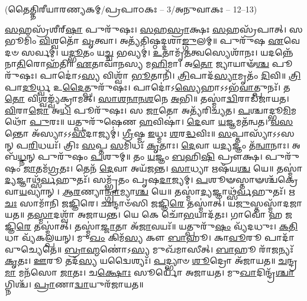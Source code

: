 
\centerline{\scriptsize(𑌤𑍈𑌤𑍍𑌤𑌿𑌰𑍀𑌯𑌾𑌰𑌣𑍍𑌯𑌕𑌮𑍍/𑌪𑍍𑌰𑌪𑌾𑌠𑌕𑌃 – 3/𑌅𑌨𑍁𑌵𑌾𑌕𑌃 – 12--13)}

\-\ul{𑌸}\-𑌹𑌸𑍍𑌰᳴𑌶𑍀𑌰𑍍‌\-\ul{𑌷𑌾} 𑌪𑍁𑌰𑍁᳴𑌷𑌃। 
\-\ul{𑌸}\-\-\ul{𑌹}\-\-\ul{𑌸𑍍𑌰𑌾}\-𑌕𑍍𑌷𑌃 \ul{𑌸}\-𑌹𑌸𑍍𑌰᳴𑌪𑌾𑌤𑍍। 
𑌸 𑌭𑍂𑌮𑌿𑌂᳴ \ul{𑌵𑌿}\-𑌶𑍍𑌵𑌤𑍋᳴ \ul{𑌵𑍃}\-𑌤𑍍𑌵𑌾। 
𑌅𑌤𑍍𑌯᳴𑌤𑌿𑌷𑍍𑌠𑌦𑍍𑌦𑌶𑌾\-\ul{𑌙𑍍𑌗𑍁}\-𑌲𑌮𑍍॥ 
% 
𑌪𑍁𑌰𑍁᳴𑌷 \ul{𑌏}\-𑌵𑍇𑌦𑍞 𑌸𑌰𑍍𑌵𑌮𑍍॑। 
𑌯\-\ul{𑌦𑍍𑌭𑍂}\-𑌤𑌂 𑌯\-\ul{𑌚𑍍𑌚} 𑌭𑌵𑍍𑌯𑌮𑍍॑। 
\-\ul{𑌉}\-𑌤𑌾𑌮𑍃᳴\-\ul{𑌤}\-𑌤𑍍𑌵𑌸𑍍𑌯𑍇𑌶𑌾᳴𑌨𑌃। 
𑌯𑌦𑌨𑍍𑌨𑍇᳴𑌨𑌾\-\ul{𑌤𑌿}\-𑌰𑍋𑌹᳴𑌤𑌿॥ 
% 
\-\ul{𑌏}\-𑌤𑌾𑌵𑌾᳴𑌨𑌸𑍍𑌯 𑌮\-\ul{𑌹𑌿}\-𑌮𑌾। 
𑌅\-\ul{𑌤𑍋} 𑌜𑍍𑌯𑌾𑌯𑌾𑍟᳴\-\ul{𑌶𑍍𑌚} 𑌪𑍂𑌰𑍁᳴𑌷𑌃। 
𑌪𑌾𑌦𑍋॑𑌽\-\ul{𑌸𑍍𑌯} 𑌵𑌿𑌶𑍍𑌵𑌾᳴ \ul{𑌭𑍂}\-𑌤𑌾𑌨𑌿᳴। 
\-\ul{𑌤𑍍𑌰𑌿}\-𑌪𑌾𑌦᳴\-\ul{𑌸𑍍𑌯𑌾}\-𑌮𑍃𑌤𑌂᳴ \ul{𑌦𑌿}\-𑌵𑌿॥ 
% 
\-\ul{𑌤𑍍𑌰𑌿}\-𑌪𑌾\-\ul{𑌦𑍂}\-𑌰𑍍𑌧𑍍𑌵 𑌉\-\ul{𑌦𑍈}\-𑌤𑍍𑌪𑍁𑌰𑍁᳴𑌷𑌃। 
𑌪𑌾𑌦𑍋॑𑌽\-\ul{𑌸𑍍𑌯𑍇}\-𑌹𑌾𑌽𑌽𑌭᳴\-\ul{𑌵𑌾}\-𑌤𑍍𑌪𑍁𑌨𑌃᳴। 
𑌤\-\ul{𑌤𑍋} 𑌵𑌿\-\ul{𑌶𑍍𑌵}\-𑌙𑍍𑌵𑍍𑌯᳴𑌕𑍍𑌰𑌾𑌮𑌤𑍍। 
\-\ul{𑌸𑌾}\-\-\ul{𑌶}\-\-\ul{𑌨𑌾}\-\-\ul{𑌨}\-\-\ul{𑌶}\-𑌨𑍇 \ul{𑌅}\-𑌭𑌿॥ 
% 
𑌤𑌸𑍍𑌮𑌾॑\-\ul{𑌦𑍍𑌵𑌿}\-𑌰𑌾𑌡᳴𑌜𑌾𑌯𑌤। 
\-\ul{𑌵𑌿}\-𑌰𑌾\-\ul{𑌜𑍋} 𑌅\-\ul{𑌧𑌿} 𑌪𑍂𑌰𑍁᳴𑌷𑌃। 
𑌸 \ul{𑌜𑌾}\-𑌤𑍋 𑌅𑌤𑍍𑌯᳴𑌰𑌿𑌚𑍍𑌯𑌤। 
\-\ul{𑌪}\-𑌶𑍍𑌚𑌾𑌦𑍍𑌭𑍂\-\ul{𑌮𑌿}\-𑌮𑌥𑍋᳴ \ul{𑌪𑍁}\-𑌰𑌃॥ 
% 
 𑌯𑌤𑍍𑌪𑍁𑌰𑍁᳴𑌷𑍇𑌣 \ul{𑌹}\-𑌵𑌿𑌷𑌾॑। 
\-\ul{𑌦𑍇}\-𑌵𑌾 \ul{𑌯}\-𑌜𑍍𑌞𑌮𑌤᳴𑌨𑍍𑌵𑌤। 
\-\ul{𑌵}\-\-\ul{𑌸}\-𑌨𑍍𑌤𑍋 𑌅᳴𑌸𑍍𑌯𑌾𑌽𑌽\-\ul{𑌸𑍀}\-𑌦𑌾𑌜𑍍𑌯𑌮𑍍॑। 
\-\ul{𑌗𑍍𑌰𑍀}\-𑌷𑍍𑌮 \ul{𑌇}\-𑌧𑍍𑌮𑌃 \ul{𑌶}\-𑌰\-\ul{𑌦𑍍𑌧}\-𑌵𑌿𑌃॥ 
% 
 \ul{𑌸}\-𑌪𑍍𑌤𑌾𑌸𑍍𑌯𑌾᳴𑌽𑌽𑌸𑌨𑍍  𑌪\-\ul{𑌰𑌿}\-𑌧𑌯𑌃᳴। 
𑌤𑍍𑌰𑌿𑌃 \ul{𑌸}\-𑌪𑍍𑌤 \ul{𑌸}\-𑌮𑌿𑌧𑌃᳴ \ul{𑌕𑍃}\-𑌤𑌾𑌃। 
\-\ul{𑌦𑍇}\-𑌵𑌾 𑌯\-\ul{𑌦𑍍𑌯}\-𑌜𑍍𑌞𑌂 𑌤᳴\-\ul{𑌨𑍍𑌵𑌾}\-𑌨𑌾𑌃। 
𑌅𑌬᳴\-\ul{𑌧𑍍𑌨}\-𑌨𑍍 𑌪𑍁𑌰𑍁᳴𑌷𑌂 \ul{𑌪}\-𑌶𑍁𑌮𑍍॥ 
% 
 𑌤𑌂 \ul{𑌯}\-𑌜𑍍𑌞𑌂 \ul{𑌬}\-\ar 𑌹𑌿\-\ul{𑌷𑌿} 𑌪𑍍𑌰𑍗𑌕𑍍𑌷\sn। 
𑌪𑍁𑌰𑍁᳴𑌷𑌂 \ul{𑌜𑌾}\-𑌤𑌮᳴\-\ul{𑌗𑍍𑌰}\-𑌤𑌃। 
𑌤𑍇𑌨᳴ \ul{𑌦𑍇}\-𑌵𑌾 𑌅𑌯᳴𑌜𑌨𑍍𑌤। 
\-\ul{𑌸𑌾}\-𑌧𑍍𑌯𑌾 𑌋𑌷᳴𑌯\-\ul{𑌶𑍍𑌚} 𑌯𑍇॥ 
% 
𑌤𑌸𑍍𑌮𑌾॑\-\ul{𑌦𑍍𑌯}\-𑌜𑍍𑌞𑌾𑌥𑍍𑌸᳴\-\ul{𑌰𑍍𑌵}\-𑌹𑍁𑌤𑌃᳴। 
𑌸𑌮𑍍𑌭𑍃᳴𑌤𑌂 𑌪𑍃𑌷\-\ul{𑌦𑌾}\-𑌜𑍍𑌯𑌮𑍍। 
\-\ul{𑌪}\-𑌶𑍂𑍟𑌸𑍍𑌤𑌾𑍟𑌶𑍍𑌚᳴𑌕𑍍𑌰𑍇 𑌵𑌾\-\ul{𑌯}\-𑌵𑍍𑌯𑌾𑌨𑍍। 
\-\ul{𑌆}\-\-\ul{𑌰}\-𑌣𑍍𑌯𑌾\-\ul{𑌨𑍍𑌗𑍍𑌰𑌾}\-𑌮𑍍𑌯𑌾\-\ul{𑌶𑍍𑌚} 𑌯𑍇॥ 
% 
 𑌤𑌸𑍍𑌮𑌾॑\-\ul{𑌦𑍍𑌯}\-𑌜𑍍𑌞𑌾𑌥𑍍𑌸᳴\-\ul{𑌰𑍍𑌵}\-𑌹𑍁𑌤𑌃᳴। 
𑌋\-\ul{𑌚𑌃} 𑌸𑌾𑌮𑌾᳴𑌨𑌿 𑌜𑌜𑍍𑌞𑌿𑌰𑍇। 
𑌛𑌨𑍍𑌦𑌾𑍞᳴𑌸𑌿 𑌜𑌜𑍍𑌞𑌿\-\ul{𑌰𑍇} 𑌤𑌸𑍍𑌮𑌾॑𑌤𑍍। 
𑌯\-\ul{𑌜𑍁}\-𑌸𑍍𑌤𑌸𑍍𑌮𑌾᳴𑌦𑌜𑌾𑌯𑌤॥ 
% 
𑌤\-\ul{𑌸𑍍𑌮𑌾}\-𑌦𑌶𑍍𑌵𑌾᳴ 𑌅𑌜𑌾𑌯𑌨𑍍𑌤। 
𑌯𑍇 𑌕𑍇 𑌚𑍋᳴\-\ul{𑌭}\-𑌯𑌾𑌦᳴𑌤𑌃। 
𑌗𑌾𑌵𑍋᳴ 𑌹 𑌜𑌜𑍍𑌞𑌿\-\ul{𑌰𑍇} 𑌤𑌸𑍍𑌮𑌾॑𑌤𑍍। 
𑌤𑌸𑍍𑌮𑌾॑\-\ul{𑌜𑍍𑌜𑌾}\-𑌤𑌾 𑌅᳴\-\ul{𑌜𑌾}\-𑌵𑌯𑌃᳴॥ 
% 
𑌯𑌤𑍍𑌪𑍁𑌰𑍁᳴\-\ul{𑌷𑌂} 𑌵𑍍𑌯᳴𑌦𑌧𑍁𑌃। 
\-\ul{𑌕}\-\-\ul{𑌤𑌿}\-𑌧𑌾 𑌵𑍍𑌯᳴𑌕𑌲𑍍𑌪𑌯𑌨𑍍। 
𑌮𑍁\-\ul{𑌖𑌂} 𑌕𑌿𑌮᳴\-\ul{𑌸𑍍𑌯} 𑌕𑍗 \ul{𑌬𑌾}\-𑌹𑍂। 
𑌕𑌾\-\ul{𑌵𑍂}\-𑌰𑍂 𑌪𑌾𑌦𑌾᳴𑌵𑍁𑌚𑍍𑌯𑍇𑌤𑍇॥ 
% 
\-\ul{𑌬𑍍𑌰𑌾}\-\-\ul{𑌹𑍍𑌮}\-𑌣𑍋॑𑌽\-\ul{𑌸𑍍𑌯} 𑌮𑍁𑌖᳴𑌮𑌾𑌸𑍀𑌤𑍍। 
\-\ul{𑌬𑌾}\-𑌹𑍂 𑌰𑌾᳴\-\ul{𑌜}\-𑌨𑍍𑌯𑌃᳴ \ul{𑌕𑍃}\-𑌤𑌃। 
\-\ul{𑌊}\-𑌰𑍂 𑌤𑌦᳴\-\ul{𑌸𑍍𑌯} 𑌯𑌦𑍍𑌵𑍈𑌶𑍍𑌯𑌃᳴। 
\-\ul{𑌪}\-𑌦𑍍𑌭𑍍𑌯𑌾𑍞 \ul{𑌶𑍂}\-𑌦𑍍𑌰𑍋 𑌅᳴𑌜𑌾𑌯𑌤॥ 
% 
\-\ul{𑌚}\-𑌨𑍍𑌦𑍍𑌰\-\ul{𑌮𑌾} 𑌮𑌨᳴𑌸𑍋 \ul{𑌜𑌾}\-𑌤𑌃। 
𑌚\-\ul{𑌕𑍍𑌷𑍋𑌃} 𑌸𑍂𑌰𑍍𑌯𑍋᳴ 𑌅𑌜𑌾𑌯𑌤। 
𑌮𑍁\-\ul{𑌖𑌾}\-𑌦𑌿𑌨𑍍𑌦𑍍𑌰᳴\-\ul{𑌶𑍍𑌚𑌾}\-𑌗𑍍𑌨𑌿𑌶𑍍𑌚᳴। 
\-\ul{𑌪𑍍𑌰𑌾}\-𑌣𑌾\-\ul{𑌦𑍍𑌵𑌾}\-𑌯𑍁𑌰᳴𑌜𑌾𑌯𑌤॥ 
